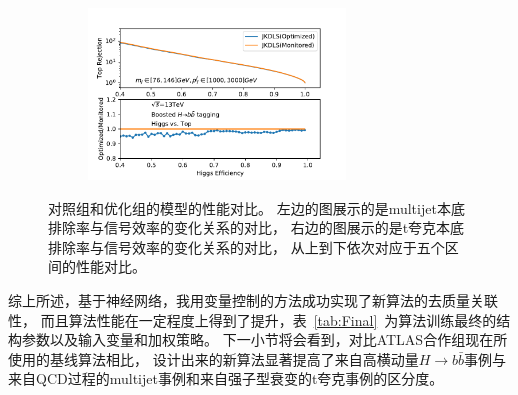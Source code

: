 \begin{figure}[htbp]
\begin{subfigure}{.5\textwidth}
    \caption{}
  \end{subfigure}
  \begin{subfigure}{.5\textwidth}
  \centering
   \includegraphics[width=0.75\textwidth]{figuresXbb/OPT/OPTopMASSPT3.pdf}
    \caption{}
  \end{subfigure}
  \caption{
对照组和优化组的模型的性能对比。
左边的图展示的是multijet本底排除率与信号效率的变化关系的对比，
右边的图展示的是t夸克本底排除率与信号效率的变化关系的对比，
从上到下依次对应于五个区间的性能对比。
  }
  \label{fig:OPTROC}
\end{figure} 

综上所述，基于神经网络，我用变量控制的方法成功实现了新算法的去质量关联性，
而且算法性能在一定程度上得到了提升，表~\ref{tab:Final}~为算法训练最终的结构参数以及输入变量和加权策略。
下一小节将会看到，对比ATLAS合作组现在所使用的基线算法相比，
设计出来的新算法显著提高了来自高横动量$H\rightarrow b\bar{b}$事例与来自QCD过程的multijet事例和来自强子型衰变的t夸克事例的区分度。

